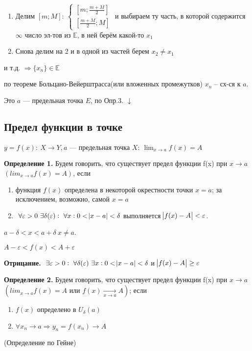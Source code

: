 \documentclass{article}
\begin{document}
  \begin{enumerate}
      \item Делим \([m; M]:\ \begin{cases}[m; \frac{m+M}{2}]\\ [\frac{m+M}{2}; M]\end{cases}\)
      и выбираем ту часть, в которой содержится \(\infty\) число эл-тов из \(\mathbb{E}\), в ней берём какой-то \(x_1\)
      \item Снова делим на 2 и в одной из частей берем \(x_2 \neq x_1\)
  \end{enumerate}
  и т.д. \(\Rightarrow \{x_n\} \in \mathbb{E}\)

  по теореме Больцано-Вейерштрасса(или вложенных промежутков) \(x_n\) -- сх-ся к \(a\).

  Это \(a\) --- предельная точка \(E\), по Опр.3.
  \(\downarrow\)

  \subsection{Предел функции в точке}

  \(y=f(x):\ X \rightarrow Y, a\) --- предельная точка \(X:\ \lim_{x \rightarrow a}{f(x)} = A\)

  \textbf{Определение 1.} Будем говорить, что существует предел функции f(x) при \(x \rightarrow a\) \( (lim_{x\rightarrow a} f(x) = A) \), если

  \begin{enumerate}
      \item функция \(f(x)\) определена в некоторой окрестности точки \(x=a\); за исключением, возможно, самой \(x=a\)
      \item \(\ \forall \varepsilon > 0\ \exists \delta(\varepsilon):\ \forall x: 0 < \abs{x - a} < \delta\) выполняется \(\abs{f(x) - A} < \varepsilon\).
  \end{enumerate}
  \(a - \delta < x < a + \delta\ x \neq a\).

  \(A - \varepsilon < f(x) < A + \varepsilon\)

  \textbf{Отрицание.} \(\ \exists \varepsilon > 0:\ \forall \delta(\varepsilon)\ \exists x: 0 < \abs{x - a} < \delta\) и \(\abs{f(x) - A} \geq \varepsilon\)

  \textbf{Определение 2.} Будем говорить, что существует предел функции f(x) при \(x \rightarrow a\) \( (lim_{x\rightarrow a} f(x) = A \textrm{ или } f(x) \xrightarrow[x \rightarrow a]{} A)\); если

  \begin{enumerate}
    \item \(f(x)\) определено в \(U_\delta(a)\)
    \item \(\forall x_n \rightarrow a \Rightarrow y_n = f(x_n)\rightarrow A\)
  \end{enumerate}
  (Определение по Гейне)
\end{document}
